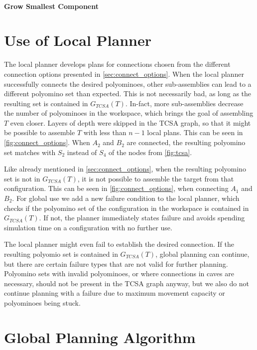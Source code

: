 \paragraph{Grow Smallest Component}




\section{Use of Local Planner}
\label{sec:local_in_global}

The local planner develops plans for connections chosen from the different connection options presented in \autoref{sec:connect_options}.
When the local planner successfully connects the desired polyominoes, other sub-assemblies can lead to a different polyomino set than expected.
This is not necessarily bad, as long as the resulting set is contained in $G_{TCSA}(T)$.
In-fact, more sub-assemblies decrease the number of polyominoes in the workspace, which brings the goal of assembling $T$ even closer.
Layers of depth were skipped in the TCSA graph, so that it might be possible to assemble $T$ with less than $n-1$ local plans.
This can be seen in \autoref{fig:connect_options}.
When $A_2$ and $B_2$ are connected, the resulting polyomino set matches with $S_2$ instead of $S_4$ of the nodes from \autoref{fig:tcsa}.

Like already mentioned in \autoref{sec:connect_options}, when the resulting polyomino set is not in $G_{TCSA}(T)$, it is not possible to assemble the target from that configuration.
This can be seen in \autoref{fig:connect_options}, when connecting $A_1$ and $B_2$.
For global use we add a new failure condition to the local planner, which checks if the polyomino set of the configuration in the workspace is contained in $G_{TCSA}(T)$.
If not, the planner immediately states failure and avoids spending simulation time on a configuration with no further use.

The local planner might even fail to establish the desired connection.
If the resulting polyomio set is contained in $G_{TCSA}(T)$, global planning can continue, but there are certain failure types that are not valid for further planning.
Polyomino sets with invalid polyominoes, or where connections in caves are necessary, should not be present in the TCSA graph anyway, but we also do not continue planning with a failure due to maximum movement capacity or polyominoes being stuck.




\section{Global Planning Algorithm}
\label{sec:global_algo}

